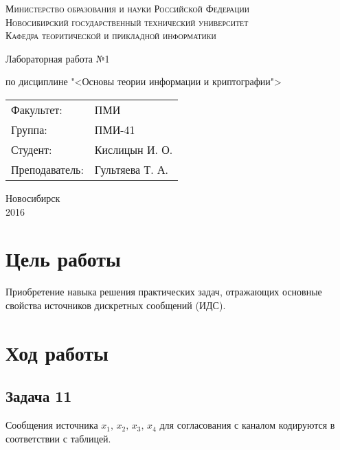 \documentclass[oneside, final, 12pt]{extarticle}
\begin{document}
\begin{titlepage}
	\begin{centering}
		\textsc{Министерство образования и науки Российской Федерации}\\
		\textsc{Новосибирский государственный технический университет}\\
		\textsc{Кафедра теоритической и прикладной информатики}\\
	\end{centering}
	\vfill
	\vfill
	\vfill
	\Large
	\centerline{Лабораторная работа №1}
	\centerline{по дисциплине "<Основы теории информации и криптографии">}
	\normalsize
	\vfill
	\vfill
	\vfill
	\begin{flushleft}
		\begin{minipage}{0.3\textwidth}
			\begin{tabular}{l l}
				Факультет: & ПМИ\\
				Группа: & ПМИ-41\\
				Студент: & Кислицын И. О.\\
				Преподаватель: & Гультяева Т. А. 
			\end{tabular}
		\end{minipage}
	\end{flushleft}
	\vfill
	\vfill
	\begin{centering}
		Новосибирск\\
		2016\\
	\end{centering}
\end{titlepage}
\setcounter{page}{2}
\section{Цель работы}
Приобретение навыка решения практических задач, отражающих основные свойства источников дискретных сообщений (ИДС).
\section{Ход работы}
\subsection{Задача 11}
Сообщения источника \(x_1,\,x_2,\,x_3,\,x_4\) для согласования с каналом кодируются в соответствии с таблицей.
\end{document}
